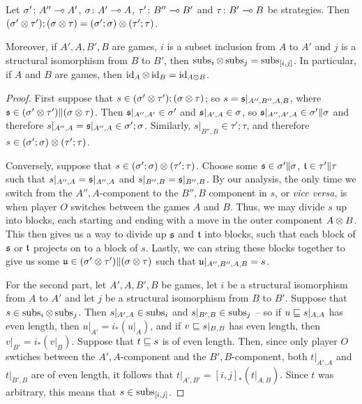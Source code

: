 \documentclass[11pt]{report}
\begin{document}
\begin{proposition}
  Let $\sigma'\colon A'' \multimap A'$, $\sigma\colon A' \multimap A$, $\tau'\colon B'' \multimap B'$ and $\tau \colon B' \multimap B$ be strategies.  
  Then $(\sigma'\otimes\tau');(\sigma\otimes\tau)=(\sigma';\sigma)\otimes(\tau';\tau)$.

  Moreover, if $A',A,B',B$ are games, $i$ is a subset inclusion from $A$ to $A'$ and $j$ is a structural isomorphism from $B$ to $B'$, then $\operatorname{subs}_i\otimes\operatorname{subs}_j = \operatorname{subs}_{[i,j]}$.
  In particular, if $A$ and $B$ are games, then $\operatorname{id}_A\otimes \operatorname{id}_B=\operatorname{id}_{A\otimes B}$.
  \label{PropTensorProductIsFunctor}
\end{proposition}
\begin{proof}
  First suppose that $s\in(\sigma'\otimes\tau');(\sigma\otimes\tau)$; so $s=\mathfrak s\vert_{A'',B'',A,B}$, where $\mathfrak s\in(\sigma'\otimes\tau')\|(\sigma\otimes\tau)$.  
  Then $\mathfrak s\vert_{A'',A'}\in\sigma'$ and $\mathfrak s\vert_{A',A}\in\sigma$, so $\mathfrak s\vert_{A'',A',A}\in\sigma'\|\sigma$ and therefore $s\vert_{A'',A}=\mathfrak s\vert_{A'',A}\in\sigma';\sigma$.  
  Similarly, $s\vert_{B'',B}\in\tau';\tau$, and therefore $s\in(\sigma';\sigma)\otimes(\tau';\tau)$.

  Conversely, suppose that $s\in(\sigma';\sigma)\otimes (\tau';\tau)$.  
  Choose some $\mathfrak s\in\sigma'\|\sigma$, $\mathfrak t\in\tau'\|\tau$ such that $s\vert_{A'',A}=\mathfrak s\vert_{A'',A}$ and $s\vert_{B'',B}=\mathfrak s\vert_{B'',B}$.  
  By our analysis, the only time we switch from the $A'',A$-component to the $B'',B$ component in $s$, or \emph{vice versa}, is when player $O$ switches between the games $A$ and $B$.  
  Thus, we may divide $s$ up into blocks, each starting and ending with a move in the outer component $A \otimes B$.  
  This then gives us a way to divide up $\mathfrak s$ and $\mathfrak t$ into blocks, such that each block of $\mathfrak s$ or $\mathfrak t$ projects on to a block of $s$.  
  Lastly, we can string these blocks together to give us some $\mathfrak u\in(\sigma'\otimes\tau')\|(\sigma\otimes\tau)$ such that $\mathfrak u\vert_{A'',B'',A,B}=s$.

  For the second part, let $A',A,B',B$ be games, let $i$ be a structural isomorphism from $A$ to $A'$ and let $j$ be a structural isomorphism from $B$ to $B'$.  
  Suppose that $s\in\operatorname{subs}_i\otimes \operatorname{subs}_j$.  
  Then $s\vert_{A',A}\in\operatorname{subs}_i$ and $s\vert_{B',B}\in\operatorname{subs}_j$ -- so if $u\sqsubseteq s\vert_{A,A}$ has even length, then $u\vert_{A'}=i_*(u\vert_A)$, and if $v\sqsubseteq s\vert_{B,B}$ has even length, then $v\vert_{B'}=i_*(v\vert_B)$.  
  Suppose that $t\sqsubseteq s$ is of even length.  
  Then, since only player $O$ swtiches between the $A',A$-component and the $B',B$-component, both $t\vert_{A',A}$ and $t\vert_{B',B}$ are of even length, it follows that $t\vert_{A',B'}=[i,j]_*(t\vert_{A,B})$.  
  Since $t$ was arbitrary, this means that $s\in \operatorname{subs}_{[i,j]}$.


\end{proof}
\end{document}
